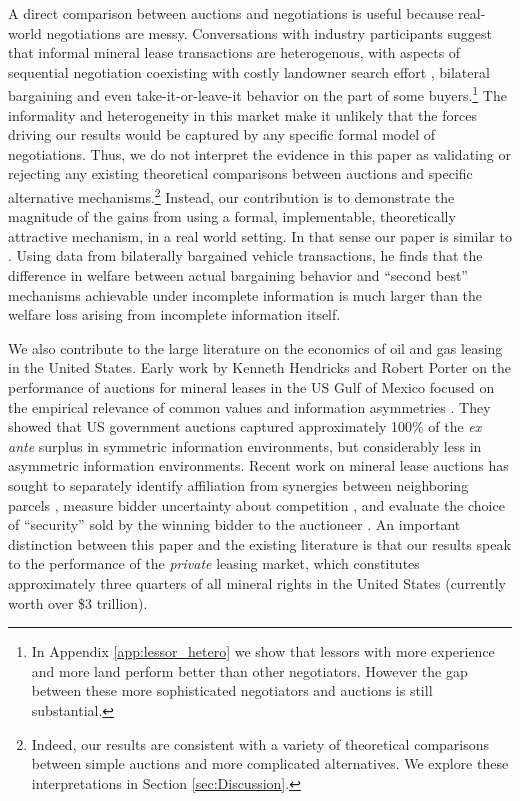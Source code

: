 \documentclass[12pt]{article}
\begin{document}
A direct comparison between auctions and negotiations is useful because real-world negotiations are messy.  Conversations with industry participants suggest that informal mineral lease transactions are heterogenous, with aspects of sequential negotiation coexisting with costly landowner search effort \citep{hortacsu_product_2004,allen_search_2014,cuesta2018price}, bilateral bargaining \citep{backus_cheap_2015, backus2, larsen2021efficiency} and even take-it-or-leave-it behavior on the part of some buyers.\footnote{In Appendix \ref{app:lessor_hetero} we show that lessors with more experience and more land perform better than other negotiators. However the gap between these more sophisticated negotiators and auctions is still substantial.}  The informality and heterogeneity in this market make it unlikely that the forces driving our results would be captured by any specific formal model of negotiations. Thus, we do not interpret the evidence in this paper as validating or rejecting any existing theoretical comparisons between auctions and specific alternative mechanisms.\footnote{Indeed, our results are consistent with a variety of theoretical comparisons between simple auctions and more complicated alternatives.  We explore these interpretations in Section \ref{sec:Discussion}.}  Instead, our contribution is to demonstrate the magnitude of the gains from using a formal, implementable, theoretically attractive mechanism, in a real world setting. In that sense our paper is similar to \cite{larsen2021efficiency}. Using data from bilaterally bargained vehicle transactions, he finds that the difference in welfare between actual bargaining behavior and ``second best'' mechanisms achievable under incomplete information is much larger than the \cite{myerson1983efficient} welfare loss arising from incomplete information itself.
 
We also contribute to the large literature on the economics of oil and gas leasing in the United States.  Early work by Kenneth Hendricks and Robert Porter on the performance of auctions for mineral leases in the US Gulf of Mexico focused on the empirical relevance of common values and information asymmetries \citep{hendricks_timing_1996, hendricks_empirical_1988}. They showed that US government auctions captured approximately 100\% of the \textit{ex ante} surplus in symmetric information environments, but considerably less in asymmetric information environments. Recent work on mineral lease auctions has sought to separately identify affiliation from synergies between neighboring parcels \citep{kong_selective_2017}, measure bidder uncertainty about competition \citep{kong2016sequential}, and evaluate the choice of ``security'' sold by the winning bidder to the auctioneer \citep{bhattacharya2018bidding}. An important distinction between this paper and the existing literature is that our results speak to the performance of the \textit{private} leasing market, which constitutes approximately three quarters of all mineral rights in the United States (currently worth over \$3 trillion).  
\end{document}
